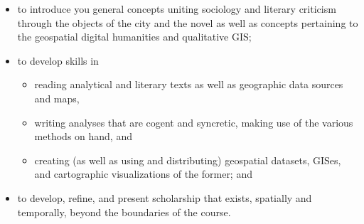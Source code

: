 \begin{itemize}

	\item to introduce you general concepts uniting sociology and literary
criticism through the objects of the city and the novel as well as concepts
pertaining to the geospatial digital humanities and qualitative GIS;

  \item to develop skills in 

    \begin{itemize}

			\item reading analytical and literary texts as well as geographic data
sources and maps,

			\item writing analyses that are cogent and syncretic, making use of the
various methods on hand, and

			\item creating (as well as using and distributing) geospatial datasets,
GISes, and cartographic visualizations of the former; and

    \end{itemize}

	\item to develop, refine, and present scholarship that exists, spatially and
temporally, beyond the boundaries of the course.

\end{itemize}

